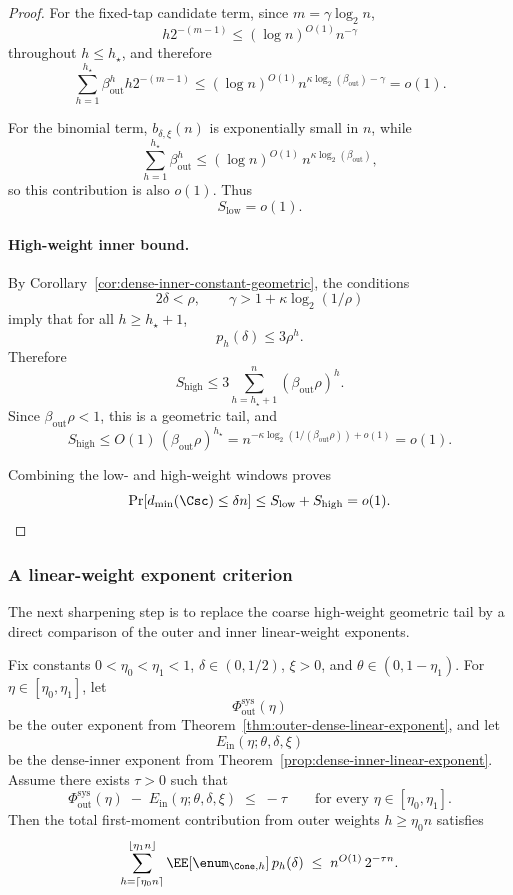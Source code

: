 \begin{proof}
For the fixed-tap candidate term, since \(m=\gamma\log_2 n\),
\[
h2^{-(m-1)}\le (\log n)^{O(1)}n^{-\gamma}
\]
throughout \(h\le h_\star\), and therefore
\[
\sum_{h=1}^{h_\star}\beta_{\mathrm{out}}^h h2^{-(m-1)}
\le
(\log n)^{O(1)}n^{\kappa\log_2(\beta_{\mathrm{out}})-\gamma}
=o(1).
\]

For the binomial term, \(b_{\delta,\xi}(n)\) is exponentially small in \(n\), while
\[
\sum_{h=1}^{h_\star} \beta_{\mathrm{out}}^h
\le
(\log n)^{O(1)}\,n^{\kappa\log_2(\beta_{\mathrm{out}})},
\]
so this contribution is also \(o(1)\).
Thus
\[
S_{\mathrm{low}}=o(1).
\]

\paragraph{High-weight inner bound.}
By Corollary~\ref{cor:dense-inner-constant-geometric}, the conditions
\[
2\delta<\rho,
\qquad
\gamma>1+\kappa\log_2(1/\rho)
\]
imply that for all \(h\ge h_\star+1\),
\[
p_h(\delta)\le 3\rho^h.
\]
Therefore
\[
S_{\mathrm{high}}
\le
3\sum_{h=h_\star+1}^{n}(\beta_{\mathrm{out}}\rho)^h.
\]
Since \(\beta_{\mathrm{out}}\rho<1\), this is a geometric tail, and
\[
S_{\mathrm{high}}
\le
O(1)\,(\beta_{\mathrm{out}}\rho)^{h_\star}
=
n^{-\kappa\log_2(1/(\beta_{\mathrm{out}}\rho))+o(1)}
=o(1).
\]

Combining the low- and high-weight windows proves
\[
\Pr[d_{\min}(\Csc)\le \delta n]
\le
S_{\mathrm{low}}+S_{\mathrm{high}}
=
o(1).
\]
\end{proof}
\subsubsection{A linear-weight exponent criterion}
\label{sec:integration-dense-dense-linear}

The next sharpening step is to replace the coarse high-weight geometric tail by a direct comparison of the outer and
inner linear-weight exponents.

\begin{theorem}
\label{thm:dense-dense-linear-weight-criterion}
Fix constants \(0<\eta_0<\eta_1<1\), \(\delta\in(0,1/2)\),
\(\xi>0\), and \(\theta\in(0,1-\eta_1)\).  For
\(\eta\in[\eta_0,\eta_1]\), let
\[
\Phi_{\mathrm{out}}^{\mathrm{sys}}(\eta)
\]
be the outer exponent from Theorem~\ref{thm:outer-dense-linear-exponent}, and let
\[
E_{\mathrm{in}}(\eta;\theta,\delta,\xi)
\]
be the dense-inner exponent from Theorem~\ref{prop:dense-inner-linear-exponent}.
Assume there exists \(\tau>0\) such that
\begin{equation}
\label{eq:dense-dense-linear-gap}
\Phi_{\mathrm{out}}^{\mathrm{sys}}(\eta)
\;-\;
E_{\mathrm{in}}(\eta;\theta,\delta,\xi)
\;\le\;
-\tau
\qquad\text{for every }\eta\in[\eta_0,\eta_1].
\end{equation}
Then the total first-moment contribution from outer weights \(h\ge \eta_0 n\) satisfies
\[
\sum_{h=\lceil \eta_0 n\rceil}^{\lfloor \eta_1 n\rfloor}
\EE[\enum_{\Cone,h}]\,p_h(\delta)
\;\le\;
n^{O(1)}\,2^{-\tau n}.
\]
\end{theorem}

